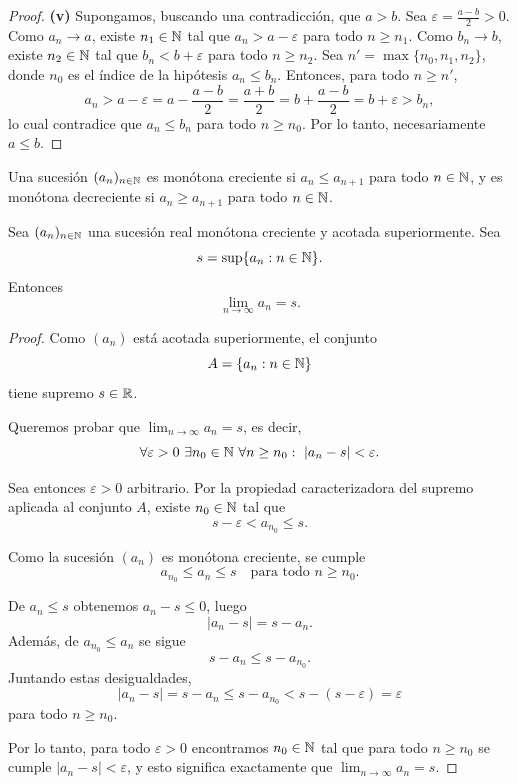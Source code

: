 \begin{proof}
\medskip
\noindent\textbf{(v)} Supongamos, buscando una contradicción, que $a > b$. Sea
$\varepsilon = \tfrac{a-b}{2} > 0$. Como $a_n \to a$, existe $n_1 \in \mathbb{N}$ tal que
$a_n > a - \varepsilon$ para todo $n \ge n_1$. Como $b_n \to b$, existe
$n_2 \in \mathbb{N}$ tal que $b_n < b + \varepsilon$ para todo $n \ge n_2$. Sea
$n' = \max\{n_0, n_1, n_2\}$, donde $n_0$ es el índice de la hipótesis
$a_n \le b_n$. Entonces, para todo $n \ge n'$,
\[
a_n > a - \varepsilon = a - \frac{a-b}{2} = \frac{a+b}{2}
= b + \frac{a-b}{2} = b + \varepsilon > b_n,
\]
lo cual contradice que $a_n \le b_n$ para todo $n \ge n_0$. Por lo tanto,
necesariamente $a \le b$.
\end{proof}

\begin{defi}
Una sucesión $(a_n)_{n\in\mathbb{N}}$ es monótona creciente si $a_n \le a_{n+1}$ para todo
$n \in \mathbb{N}$, y es monótona decreciente si $a_n \ge a_{n+1}$ para todo $n \in \mathbb{N}$.
\end{defi}

\begin{prop}
Sea $(a_n)_{n\in\mathbb{N}}$ una sucesión real monótona creciente y acotada superiormente.
Sea
\[
s = \sup\{a_n : n \in \mathbb{N}\}.
\]
Entonces
\[
\lim_{n\to\infty} a_n = s.
\]
\end{prop}

\begin{proof}
Como $(a_n)$ está acotada superiormente, el conjunto
\[
A = \{a_n : n \in \mathbb{N}\}
\]
tiene supremo $s \in \mathbb{R}$.

Queremos probar que $\lim_{n\to\infty} a_n = s$, es decir,
\[
\forall \varepsilon > 0 \ \exists n_0 \in \N \ \forall n \ge n_0:
\ |a_n - s| < \varepsilon.
\]

Sea entonces $\varepsilon > 0$ arbitrario. Por la propiedad
caracterizadora del supremo aplicada al conjunto $A$, existe
$n_0 \in \mathbb{N}$ tal que
\[
s - \varepsilon < a_{n_0} \le s.
\]

Como la sucesión $(a_n)$ es monótona creciente, se cumple
\[
a_{n_0} \le a_n \le s \quad \text{para todo } n \ge n_0.
\]

De $a_n \le s$ obtenemos $a_n - s \le 0$, luego
\[
|a_n - s| = s - a_n.
\]
Además, de $a_{n_0} \le a_n$ se sigue
\[
s - a_n \le s - a_{n_0}.
\]
Juntando estas desigualdades,
\[
|a_n - s|
= s - a_n
\le s - a_{n_0}
< s - (s - \varepsilon)
= \varepsilon
\]
para todo $n \ge n_0$.

Por lo tanto, para todo $\varepsilon>0$ encontramos $n_0 \in \mathbb{N}$ tal que
para todo $n \ge n_0$ se cumple $|a_n - s|<\varepsilon$, y esto significa
exactamente que $\lim_{n\to\infty} a_n = s$.
\end{proof}

